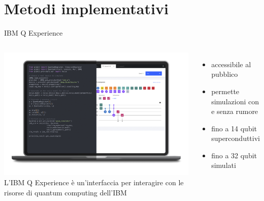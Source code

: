 \documentclass{beamer}
\begin{document}
    \section{Metodi implementativi}

    \begin{frame}{IBM Q Experience}
        \begin{columns}
            \includegraphics[width=\textwidth]{gfx/laptop_strumenti.png}
            L'IBM Q Experience è un'interfaccia per interagire con le risorse di quantum computing dell'IBM
            \begin{itemize}
                \item accessibile al pubblico
                \item permette simulazioni con e senza rumore
                \item fino a 14 qubit superconduttivi
                \item fino a 32 qubit simulati
            \end{itemize}
        \end{columns}
    \end{frame}
\end{document}
